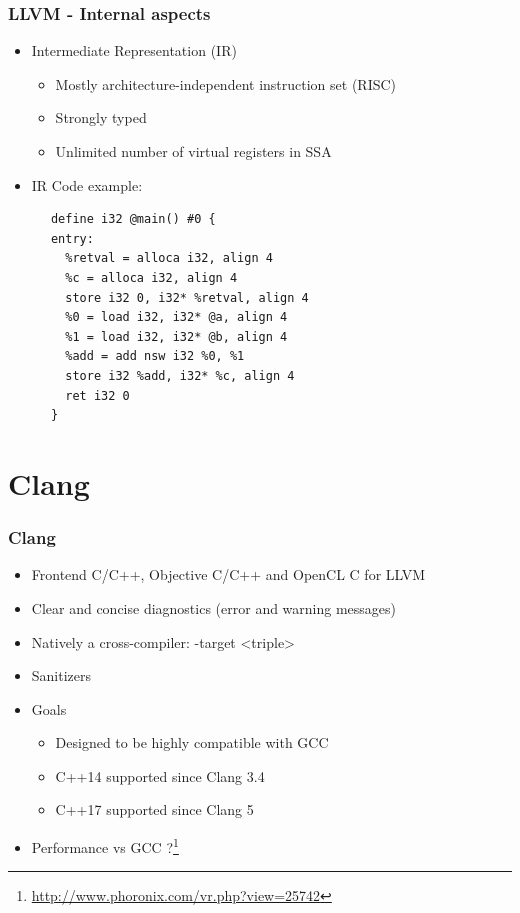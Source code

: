\documentclass{beamer}
\begin{document}
\begin{frame}[fragile]
\frametitle{LLVM - Internal aspects}
\begin{itemize}
  \item Intermediate Representation (IR)
  \begin{itemize}
    \item Mostly architecture-independent instruction set (RISC)
    \item Strongly typed
    \item Unlimited number of virtual registers in SSA
  \end{itemize}
  \item IR Code example:
\end{itemize}

\begin{lstlisting}
      define i32 @main() #0 {
      entry:
        %retval = alloca i32, align 4
        %c = alloca i32, align 4
        store i32 0, i32* %retval, align 4
        %0 = load i32, i32* @a, align 4
        %1 = load i32, i32* @b, align 4
        %add = add nsw i32 %0, %1
        store i32 %add, i32* %c, align 4
        ret i32 0
      }
\end{lstlisting}
\end{frame}


\section{Clang}

\begin{frame}
\frametitle{Clang}
\begin{itemize}
  \item Frontend C/C++, Objective C/C++ and OpenCL C for LLVM
  \item Clear and concise diagnostics (error and warning messages)
  \item Natively a cross-compiler: {\selectfont -target <triple>}
  \item Sanitizers
  \item Goals
  \begin{itemize}
    \item Designed to be highly compatible with GCC
    \item C++14 supported since Clang 3.4
    \item C++17 supported since Clang 5
  \end{itemize}
  \item Performance vs GCC ?\footnote{\url{http://www.phoronix.com/vr.php?view=25742}}
\end{itemize}
\end{frame}
\end{document}
